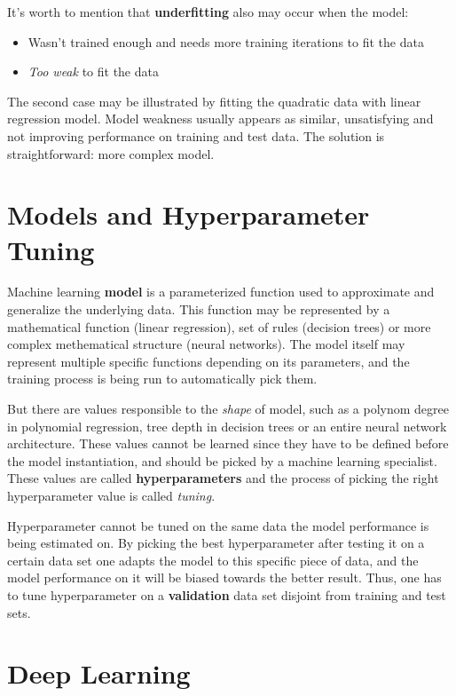 \documentclass[thesis=B,english]{FITthesis}[2019/12/23]
\begin{document}
It's worth to mention that \textbf{underfitting} also may occur when the model:
\begin{itemize}
	\item Wasn't trained enough and needs more training iterations to fit the data
	\item \textit{Too weak} to fit the data
\end{itemize}

The second case may be illustrated by fitting the quadratic data with linear regression model. Model weakness usually appears as similar, unsatisfying and not improving performance on training and test data. The solution is straightforward: more complex model.

\section{Models and Hyperparameter Tuning}

Machine learning \textbf{model} is a parameterized function used to approximate and generalize the underlying data. This function may be represented by a mathematical function (linear regression), set of rules (decision trees) or more complex methematical structure (neural networks). The model itself may represent multiple specific functions depending on its parameters, and the training process is being run to automatically pick them.

But there are values responsible to the \textit{shape} of model, such as a polynom degree in polynomial regression, tree depth in decision trees or an entire neural network architecture. These values cannot be learned since they have to be defined before the model instantiation, and should be picked by a machine learning specialist. These values are called \textbf{hyperparameters} and the process of picking the right hyperparameter value is called \textit{tuning}.

Hyperparameter cannot be tuned on the same data the model performance is being estimated on. By picking the best hyperparameter after testing it on a certain data set one adapts the model to this specific piece of data, and the model performance on it will be biased towards the better result. Thus, one has to tune hyperparameter on a \textbf{validation} data set disjoint from training and test sets.

\section{Deep Learning}
\end{document}
